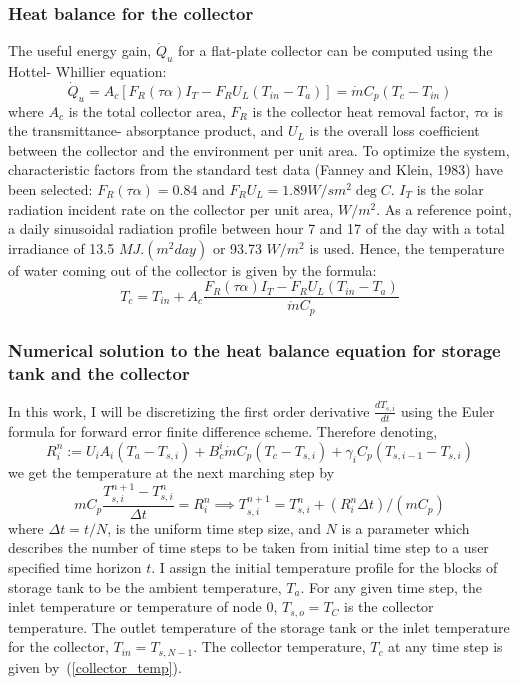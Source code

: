 \documentclass{article}
\begin{document}
\subsubsection*{Heat balance for the collector}
The useful energy gain, $\dot{Q}_u$ for a flat-plate collector can be computed using the Hottel- Whillier equation:
\begin{equation}
\dot{Q}_u = A_c [F_R (\tau \alpha) I_T- F_R U_L (T_{in} - T_a)] =  \dot{m} C_p (T_c - T_{in})
\end{equation}
where $A_c$ is the total collector area, $F_R$ is the collector heat removal factor, $\tau \alpha$ is the transmittance- absorptance product, and $U_L$ is the overall loss coefficient between the collector and the environment per unit area. To optimize the system, characteristic factors from the standard test data (Fanney and Klein, 1983) have been selected:
$F_R (\tau \alpha) = 0.84$ and $F_R U_L = 1.89 W / s m^2 \deg  C$. $I_T$ is the solar radiation incident rate on the collector per unit area, $W /m^2$. As a reference point, a daily sinusoidal radiation profile between hour 7 and 17 of the day with a total irradiance of 13.5 $MJ . (m^2 day)$ or 93.73 $W/m^2$ is used.
Hence, the temperature of water coming out of the collector is given by the formula:
\begin{equation}\label{collector_temp}
T_c = T_{in} + A_c \frac{F_R (\tau \alpha)  I_T - F_R U_L (T_{in} - T_a)} { \dot{m} C_p}
\end{equation}


\subsubsection*{Numerical solution to the heat balance equation for storage tank and the collector}
In this work, I will be discretizing the first order derivative $\frac {dT_{s,i}} {dt} $ using the Euler formula for forward error finite difference scheme. Therefore denoting,
\begin{equation*}
R_i^n := U_i A_i (T_a - T_{s,i}) + B_c^i \dot{m} C_p (T_c - T_{s,i}) + \gamma_i C_p (T_{s, i-1} - T_{s,i})
\end{equation*}
we get the temperature at the next marching step by
\begin{equation}
m C_p \frac {T_{s,i}^{n+1} - T_{s,i}^n} {\Delta t} = R_i^n \implies T_{s,i}^{n+1} =  T_{s,i}^n + (R_i^n \Delta t) / (m C_p)
\end{equation}
where $\Delta t = t / N$, is the uniform time step size, and $N$ is a parameter which describes the number of time steps to be taken from initial time step to a user specified time horizon $t$. I assign the initial temperature profile for the blocks of storage tank to be the ambient temperature, $T_a$.  For any given time step, the inlet temperature or temperature of node $0$, $T_{s, o} = T_C$ is the collector temperature. The outlet temperature of the storage tank or the inlet temperature for the collector, $T_{in} = T_{s, N-1}$. The collector temperature, $T_c$ at any time step is given by~(\ref{collector_temp}).
\end{document}
